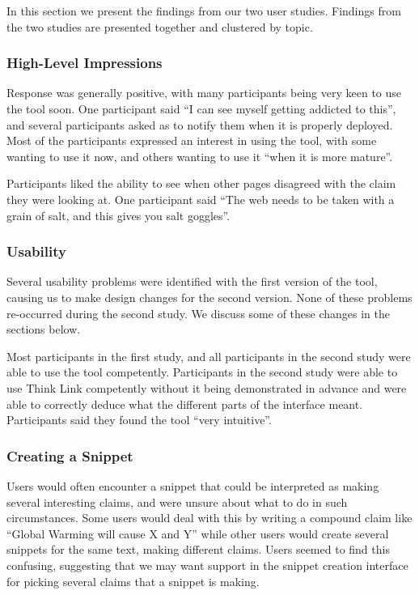 \documentclass{chi2009}
\begin{document}
In this section we present the findings from our two user studies. Findings from the two studies are presented together and clustered by topic.

\subsubsection{High-Level Impressions}

Response was generally positive, with many participants being very keen to use the tool soon. One participant said ``I can see myself getting addicted to this'', and several participants asked as to notify them when it is properly deployed. Most of the participants expressed an interest in using the tool, with some wanting to use it now, and others wanting to use it ``when it is more mature''.

Participants liked the ability to see when other pages disagreed with the claim they were looking at. One participant said ``The web needs to be taken with a grain of salt, and this gives you salt goggles''.

\subsubsection{Usability}

Several usability problems were identified with the first version of the tool, causing us to make design changes for the second version. None of these problems re-occurred during the second study. We discuss some of these changes in the sections below.

Most participants in the first study, and all participants in the second study were able to use the tool competently. Participants in the second study were able to use Think Link competently without it being demonstrated in advance and were able to correctly deduce what the different parts of the interface meant. Participants said they found the tool ``very intuitive''.


\subsubsection{Creating a Snippet}

Users would often encounter a snippet that could be interpreted as making several interesting claims, and were unsure about what to do in such circumstances. Some users would deal with this by writing a compound claim like ``Global Warming will cause X and Y'' while other users would create several snippets for the same text, making different claims. Users seemed to find this confusing, suggesting that we may want support in the snippet creation interface for picking several claims that a snippet is making.
\end{document}
